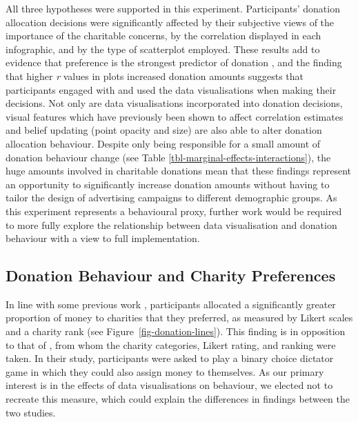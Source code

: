 \documentclass[
  authoryear,
  preprint,
  3p]{elsarticle}
\begin{document}
All three hypotheses were supported in this experiment. Participants'
donation allocation decisions were significantly affected by their
subjective views of the importance of the charitable concerns, by the
correlation displayed in each infographic, and by the type of
scatterplot employed. These results add to evidence that preference is
the strongest predictor of donation
\citep{breeze_2013, berman_2018, macaskill_2019}, and the finding that
higher \emph{r} values in plots increased donation amounts suggests that
participants engaged with and used the data visualisations when making
their decisions. Not only are data visualisations incorporated into
donation decisions, visual features which have previously been shown to
affect correlation estimates and belief updating (point opacity and
size) are also able to alter donation allocation behaviour. Despite only
being responsible for a small amount of donation behaviour change (see
Table \ref{tbl-marginal-effects-interactions}), the huge amounts
involved in charitable donations \citep{gov_report} mean that these
findings represent an opportunity to significantly increase donation
amounts without having to tailor the design of advertising campaigns to
different demographic groups. As this experiment represents a
behavioural proxy, further work would be required to more fully explore
the relationship between data visualisation and donation behaviour with
a view to full implementation.

\subsection{Donation Behaviour and Charity
Preferences}\label{donation-behaviour-and-charity-preferences}

In line with some previous work \citep{breeze_2013, berman_2018},
participants allocated a significantly greater proportion of money to
charities that they preferred, as measured by Likert scales and a
charity rank (see Figure~\ref{fig-donation-lines}). This finding is in
opposition to that of \citet{she_2023}, from whom the charity
categories, Likert rating, and ranking were taken. In their study,
participants were asked to play a binary choice dictator game in which
they could also assign money to themselves. As our primary interest is
in the effects of data visualisations on behaviour, we elected not to
recreate this measure, which could explain the differences in findings
between the two studies.
\end{document}
